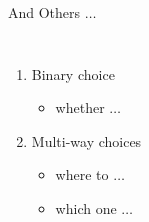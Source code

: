 \begin{frame}{}
  \centerline{\huge And Others $\dots$}
\end{frame}

\begin{frame}
  \centerline{}

  \vspace{0.50cm}
  \begin{columns}
      \begin{enumerate}[(1)]
	\item Binary choice
	  \begin{itemize}
	    \item whether $\dots$
	  \end{itemize}
	\item Multi-way choices
	  \begin{itemize}
	    \item where to $\dots$ 
	    \item which one $\dots$
	  \end{itemize}
      \end{enumerate}
  \end{columns}
\end{frame}
